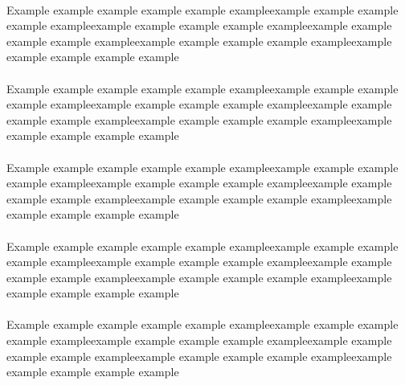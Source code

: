 
\paragraph{} Example example example example example exampleexample example example example exampleexample example example example exampleexample example example example exampleexample example example example exampleexample example example example example


\paragraph{} Example example example example example exampleexample example example example exampleexample example example example exampleexample example example example exampleexample example example example exampleexample example example example example
\paragraph{} Example example example example example exampleexample example example example exampleexample example example example exampleexample example example example exampleexample example example example exampleexample example example example example
\paragraph{} Example example example example example exampleexample example example example exampleexample example example example exampleexample example example example exampleexample example example example exampleexample example example example example
\paragraph{} Example example example example example exampleexample example example example exampleexample example example example exampleexample example example example exampleexample example example example exampleexample example example example example

